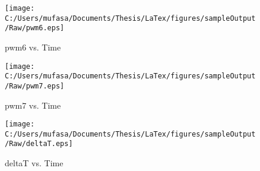 \begin{figure}[H]
	\centering
	\caption{pwm6 vs. Time}
		\texttt{[image: C:/Users/mufasa/Documents/Thesis/LaTex/figures/sampleOutput/Raw/pwm6.eps]}
\end{figure}
\begin{figure}[H]
	\centering
	\caption{pwm7 vs. Time}
		\texttt{[image: C:/Users/mufasa/Documents/Thesis/LaTex/figures/sampleOutput/Raw/pwm7.eps]}
\end{figure}
\begin{figure}[H]
	\centering
	\caption{deltaT vs. Time}
		\texttt{[image: C:/Users/mufasa/Documents/Thesis/LaTex/figures/sampleOutput/Raw/deltaT.eps]}
\end{figure}
